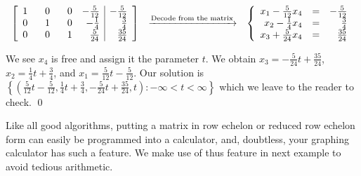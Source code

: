 \documentclass{ximera}
\begin{document}
\begin{example}
\[\begin{array}{ccc}
 \left[ \begin{array}{rrrr|r}
 1 & \hphantom{-}0 & \hphantom{-}0 & -\frac{5}{12} & -\frac{5}{12} \\  
 0 & 1 & 0 & -\frac{1}{4} & \frac{3}{4} \\  
 0 & 0& 1 & \frac{5}{24} & \frac{35}{24} \\  \end{array} \right] 
 
& 
\xrightarrow{\text{Decode from the matrix}} 
& 
\left\{ \begin{array}{rcr} 
x_1 - \frac{5}{12} x_4 & = & -\frac{5}{12} \\  
x_2 - \frac{1}{4}x_4 & = & \frac{3}{4} \\  
x_3 + \frac{5}{24} x_4 & = & \frac{35}{24} \end{array} \right.

\end{array}\]

We see  $x_4$ is free and assign it the parameter $t$.  We obtain $x_3 = -\frac{5}{24} t + \frac{35}{24}$, $x_2 = \frac{1}{4} t + \frac{3}{4}$, and $x_1 = \frac{5}{12}t - \frac{5}{12}$.  Our solution is $\left\{ \left( \frac{5}{12}t - \frac{5}{12}, \frac{1}{4} t + \frac{3}{4}, -\frac{5}{24} t + \frac{35}{24}, t \right) : -\infty < t < \infty \right\}$ which we leave to the reader to check. \qed

\end{example}

Like all good algorithms, putting a matrix in row echelon or reduced row echelon form can easily be programmed into a calculator, and, doubtless, your graphing calculator has such a feature.  We make use of thus feature in next example to avoid tedious arithmetic.
\end{document}
